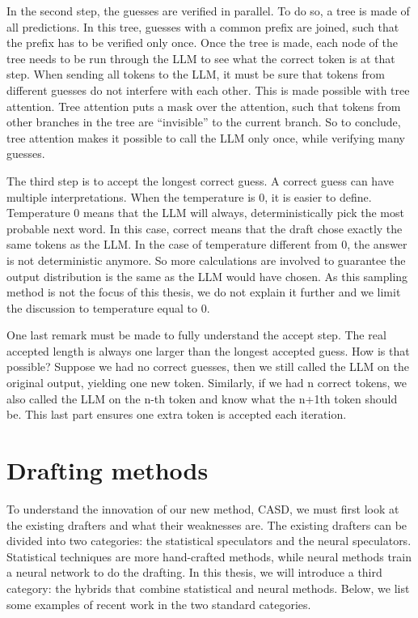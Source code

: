 In the second step, the guesses are verified in parallel. To do so, a tree is made of all predictions. In this tree, guesses with a common prefix are joined, such that the prefix has to be verified only once. Once the tree is made, each node of the tree needs to be run through the LLM to see what the correct token is at that step. When sending all tokens to the LLM, it must be sure that tokens from different guesses do not interfere with each other. This is made possible with tree attention. Tree attention puts a mask over the attention, such that tokens from other branches in the tree are ``invisible'' to the current branch. So to conclude, tree attention makes it possible to call the LLM only once, while verifying many guesses.

The third step is to accept the longest correct guess. A correct guess can have multiple interpretations. When the temperature is 0, it is easier to define. Temperature 0 means that the LLM will always, deterministically pick the most probable next word. In this case, correct means that the draft chose exactly the same tokens as the LLM. In the case of temperature different from 0, the answer is not deterministic anymore. So more calculations are involved to guarantee the output distribution is the same as the LLM would have chosen. As this sampling method is not the focus of this thesis, we do not explain it further and we limit the discussion to temperature equal to 0. 

One last remark must be made to fully understand the accept step. The real accepted length is always one larger than the longest accepted guess. How is that possible? Suppose we had no correct guesses, then we still called the LLM on the original output, yielding one new token. Similarly, if we had n correct tokens, we also called the LLM on the n-th token and know what the n+1th token should be. This last part ensures one extra token is accepted each iteration.

\section{Drafting methods}
\label{sec:drafting_methods}
To understand the innovation of our new method, CASD, we must first look at the existing drafters and what their weaknesses are. The existing drafters can be divided into two categories: the statistical speculators and the neural speculators. Statistical techniques are more hand-crafted methods, while neural methods train a neural network to do the drafting. In this thesis, we will introduce a third category: the hybrids that combine statistical and neural methods. Below, we list some examples of recent work in the two standard categories.

